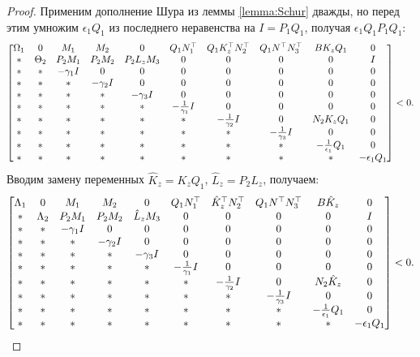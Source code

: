 \begin{proof}
	Применим дополнение Шура из леммы {\ref{lemma:Schur}} дважды, но перед этим умножим $\epsilon_1 Q_1$ из последнего неравенства на $I =P_1 Q_1$, получая  $\epsilon_1 Q_1 P_1 Q_1$: 
	\begin{equation}
		\label{eq:thm3_LMI_before_alpha_beta_1}
		\begin{bmatrix}
			{\Omega}_1 & 0 & {M}_1 & {M}_2 & 0& {Q}_1{N}_1^\top & {Q}_1{K}_z^\top{N}_2^\top & {Q}_1 {N}^\top{N}_3^\top & B K_z Q_1 & 0
			\\
			* & {\Theta}_2 & {P}_2{M}_1 & {P}_2{M}_2 & {P}_2{L}_z{M}_3 & 0 & 0 & 0 & 0 & I\\
			* & * & -\gamma_1{I} & 0&0&0&0&0 &0&0\\
			* & * & * & -\gamma_2{I}&0&0&0&0 &0&0\\
			* & * & * & *&-\gamma_3{I}&0&0&0 &0&0\\
			* & * & * & *&*&-\frac{1}{\gamma_1}{I}&0&0 &0&0\\
			* & * & * & *&*&*&-\frac{1}{\gamma_2}{I}&0 &N_2 K_z Q_1&0\\
			*&* & * & * & *&*&*&-\frac{1}{\gamma_3}{I} &0&0\\
			*&* & * & * & *&*&*&* &-\frac{1}{\epsilon_1}{Q}_1&0\\
			* & * & * & *&*&*&*&*&*&-\epsilon_1{Q}_1
		\end{bmatrix}<0.
	\end{equation}
	Вводим замену переменных $\hat{{K}}_z={K}_z{Q}_1$, $\hat{{L}}_z={P}_2{L}_z$, получаем:
	\begin{equation}
		\label{eq:thm3_LMI_before_alpha_beta}
		\begin{bmatrix}
			{\Lambda}_1 & 0 & {M}_1 & {M}_2&0 & {Q}_1{N}_1^\top & \hat{{K}}_z^\top{N}_2^\top & {Q}_1 {N}^\top{N}_3^\top & {B}\hat{{K}}_z & 0\\
			* & {\Lambda}_2 & {P}_2{M}_1 & {P}_2{M}_2 & \hat{{L}}_z{M}_3& 0& 0&0&0&{I} \\
			* & * & -\gamma_1{I} & 0&0&0&0&0&0&0\\
			* & * &*  & -\gamma_2{I}&0&0&0&0&0&0\\
			*& * & * &*  & -\gamma_3{I}&0&0&0&0&0\\
			* &* & * & * & *&-\frac{1}{\gamma_1}{I}&0&0&0&0\\
			* & * & * &*& *&*&-\frac{1}{\gamma_2}{I}& 0&{N}_2\hat{{K}}_z&0\\
			*&*&* &* & * & * & *&-\frac{1}{\gamma_3}{I}&0&0\\
			* & * & *&*&* & *&*&*&-\frac{1}{\epsilon_1}{Q}_1&0\\
			* & * & * & *&*&*&*&*&*&-\epsilon_1{Q}_1\\
		\end{bmatrix}<0.
	\end{equation}
	

\end{proof}
